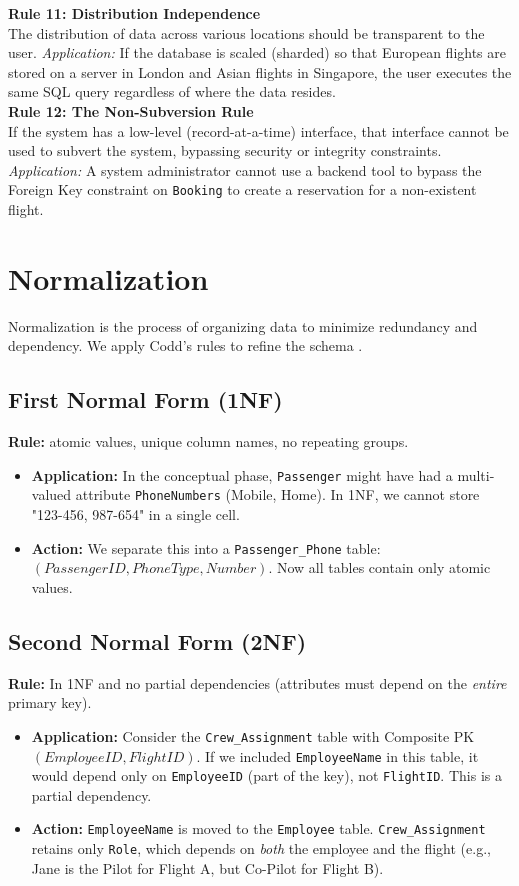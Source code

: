 \documentclass[12pt, a4paper]{article}
\begin{document}
	\textbf{Rule 11: Distribution Independence} \\
	The distribution of data across various locations should be transparent to the user.
	\textit{Application:} If the database is scaled (sharded) so that European flights are stored on a server in London and Asian flights in Singapore, the user executes the same SQL query regardless of where the data resides.\\
	
	\textbf{Rule 12: The Non-Subversion Rule} \\
	If the system has a low-level (record-at-a-time) interface, that interface cannot be used to subvert the system, bypassing security or integrity constraints.
	\textit{Application:} A system administrator cannot use a backend tool to bypass the Foreign Key constraint on \texttt{Booking} to create a reservation for a non-existent flight.
	
	\newpage
	\section{Normalization}
	
	Normalization is the process of organizing data to minimize redundancy and dependency. We apply Codd's rules to refine the schema \cite{ref7, ref48}.
	
	\subsection{First Normal Form (1NF)}
	\textbf{Rule:} atomic values, unique column names, no repeating groups.
	\begin{itemize}
		\item \textbf{Application:} In the conceptual phase, \texttt{Passenger} might have had a multi-valued attribute \texttt{PhoneNumbers} (Mobile, Home). In 1NF, we cannot store "123-456, 987-654" in a single cell.
		\item \textbf{Action:} We separate this into a \texttt{Passenger\_Phone} table: $(PassengerID, PhoneType, Number)$. Now all tables contain only atomic values.
	\end{itemize}
	
	\subsection{Second Normal Form (2NF)}
	\textbf{Rule:} In 1NF and no partial dependencies (attributes must depend on the \textit{entire} primary key).
	\begin{itemize}
		\item \textbf{Application:} Consider the \texttt{Crew\_Assignment} table with Composite PK \\$(EmployeeID, FlightID)$. If we included \texttt{EmployeeName} in this table, it would depend only on \texttt{EmployeeID} (part of the key), not \texttt{FlightID}. This is a partial dependency.
		\item \textbf{Action:} \texttt{EmployeeName} is moved to the \texttt{Employee} table. \texttt{Crew\_Assignment} retains only \texttt{Role}, which depends on \textit{both} the employee and the flight (e.g., Jane is the Pilot for Flight A, but Co-Pilot for Flight B).
	\end{itemize}
	
\end{document}
